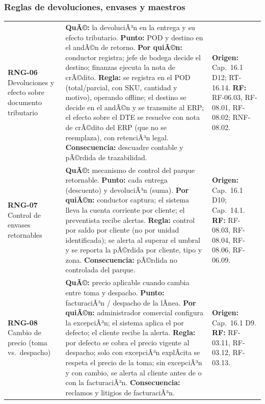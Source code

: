 \subsubsection{Reglas de devoluciones, envases y maestros}

\begin{table}[htbp]
\centering
\small
\begin{tabularx}{\textwidth}{@{}L{2.4cm}L{8.3cm}L{4.2cm}@{}}
\toprule
\textbf{RNG-06} \textbar{} Devoluciones y efecto sobre documento tributario &
\textbf{QuÃ©:} la devoluciÃ³n en la entrega y su efecto tributario. \textbf{Punto:} POD y
destino en el andÃ©n de retorno. \textbf{Por quiÃ©n:} conductor registra; jefe de bodega
decide el destino; finanzas ejecuta la nota de crÃ©dito. \textbf{Regla:} se registra en el
POD (total/parcial, con SKU, cantidad y motivo), operando offline; el destino se decide
en el andÃ©n y se transmite al ERP; el efecto sobre el DTE se resuelve con nota de crÃ©dito
del ERP (que no se reemplaza), con retenciÃ³n legal. \textbf{Consecuencia:} descuadre
contable y pÃ©rdida de trazabilidad. &
\textbf{Origen:} Cap.\ 16.1 D12; RT-16.14. \textbf{RF:} RF-06.03, RF-08.01, RF-08.02;
RNF-08.02. \\
\addlinespace
\textbf{RNG-07} \textbar{} Control de envases retornables &
\textbf{QuÃ©:} mecanismo de control del parque retornable. \textbf{Punto:} cada entrega
(descuento) y devoluciÃ³n (suma). \textbf{Por quiÃ©n:} conductor captura; el sistema lleva
la cuenta corriente por cliente; el preventista recibe alertas. \textbf{Regla:} control
por saldo por cliente (no por unidad identificada); se alerta al superar el umbral y se
reporta la pÃ©rdida por cliente, tipo y zona. \textbf{Consecuencia:} pÃ©rdida no controlada
del parque. &
\textbf{Origen:} Cap.\ 16.1 D10; Cap.\ 14.1. \textbf{RF:} RF-08.03, RF-08.04, RF-08.06,
RF-06.09. \\
\addlinespace
\textbf{RNG-08} \textbar{} Cambio de precio (toma vs.\ despacho) &
\textbf{QuÃ©:} precio aplicable cuando cambia entre toma y despacho. \textbf{Punto:}
facturaciÃ³n / despacho de la lÃ­nea. \textbf{Por quiÃ©n:} administrador comercial configura
la excepciÃ³n; el sistema aplica el por defecto; el cliente recibe la alerta.
\textbf{Regla:} por defecto se cobra el precio vigente al despacho; solo con excepciÃ³n
explÃ­cita se respeta el precio de la toma; sin excepciÃ³n y con cambio, se alerta al
cliente antes de o con la facturaciÃ³n. \textbf{Consecuencia:} reclamos y litigios de
facturaciÃ³n. &
\textbf{Origen:} Cap.\ 16.1 D9. \textbf{RF:} RF-03.11, RF-03.12, RF-03.13. \\

\end{tabularx}
\end{table}
